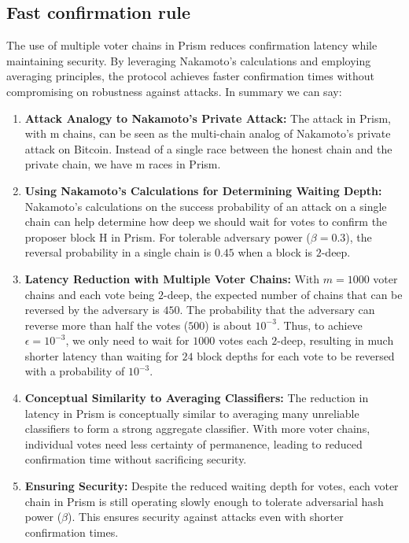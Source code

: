 \documentclass{report}
\begin{document}
\subsection{Fast confirmation rule}
The use of multiple voter chains in Prism reduces confirmation latency while maintaining security. By leveraging Nakamoto's calculations and employing averaging principles, the protocol achieves faster confirmation times without compromising on robustness against attacks. In summary we can say:
\begin{enumerate}
	\item \textbf{Attack Analogy to Nakamoto's Private Attack:} The attack in Prism, with m chains, can be seen as the multi-chain analog of Nakamoto's private attack on Bitcoin. Instead of a single race between the honest chain and the private chain, we have m races in Prism.
	\item \textbf{Using Nakamoto's Calculations for Determining Waiting Depth:} Nakamoto's calculations on the success probability of an attack on a single chain can help determine how deep we should wait for votes to confirm the proposer block H in Prism. For tolerable adversary power ($\beta = 0.3$), the reversal probability in a single chain is $0.45$ when a block is $2$-deep.
	\item \textbf{Latency Reduction with Multiple Voter Chains:} With $m = 1000$ voter chains and each vote being $2$-deep, the expected number of chains that can be reversed by the adversary is $450$. The probability that the adversary can reverse more than half the votes ($500$) is about $10^{-3}$. Thus, to achieve $\epsilon = 10^{-3}$, we only need to wait for $1000$ votes each $2$-deep, resulting in much shorter latency than waiting for $24$ block depths for each vote to be reversed with a probability of $10^{-3}$.
	\item \textbf{Conceptual Similarity to Averaging Classifiers:} The reduction in latency in Prism is conceptually similar to averaging many unreliable classifiers to form a strong aggregate classifier. With more voter chains, individual votes need less certainty of permanence, leading to reduced confirmation time without sacrificing security.
	\item \textbf{Ensuring Security:} Despite the reduced waiting depth for votes, each voter chain in Prism is still operating slowly enough to tolerate adversarial hash power ($\beta$). This ensures security against attacks even with shorter confirmation times.
\end{enumerate}
\end{document}
